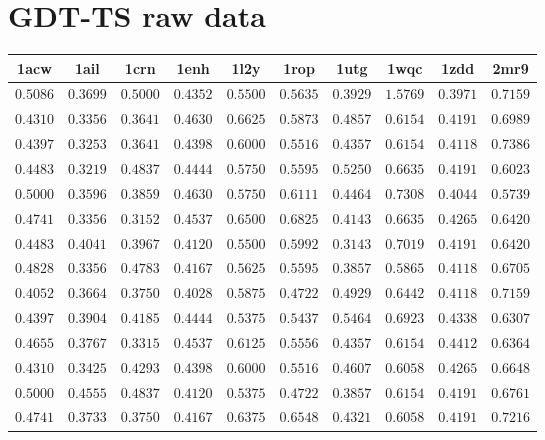 \chapter{GDT-TS raw data}\label{appendix:gdtts-data}

\centering
\begin{longtable}{c|c|c|c|c|c|c|c|c|c}
1acw & 1ail & 1crn & 1enh & 1l2y & 1rop & 1utg & 1wqc & 1zdd & 2mr9 \\ \hline \hline
$0.5086$ & $0.3699$ & $0.5000$ & $0.4352$ & $0.5500$ & $0.5635$ & $0.3929$ & $1.5769$ & $0.3971$ & $0.7159$ \\ \hline
$0.4310$ & $0.3356$ & $0.3641$ & $0.4630$ & $0.6625$ & $0.5873$ & $0.4857$ & $0.6154$ & $0.4191$ & $0.6989$ \\ \hline
$0.4397$ & $0.3253$ & $0.3641$ & $0.4398$ & $0.6000$ & $0.5516$ & $0.4357$ & $0.6154$ & $0.4118$ & $0.7386$ \\ \hline
$0.4483$ & $0.3219$ & $0.4837$ & $0.4444$ & $0.5750$ & $0.5595$ & $0.5250$ & $0.6635$ & $0.4191$ & $0.6023$ \\ \hline
$0.5000$ & $0.3596$ & $0.3859$ & $0.4630$ & $0.5750$ & $0.6111$ & $0.4464$ & $0.7308$ & $0.4044$ & $0.5739$ \\ \hline
$0.4741$ & $0.3356$ & $0.3152$ & $0.4537$ & $0.6500$ & $0.6825$ & $0.4143$ & $0.6635$ & $0.4265$ & $0.6420$ \\ \hline
$0.4483$ & $0.4041$ & $0.3967$ & $0.4120$ & $0.5500$ & $0.5992$ & $0.3143$ & $0.7019$ & $0.4191$ & $0.6420$ \\ \hline
$0.4828$ & $0.3356$ & $0.4783$ & $0.4167$ & $0.5625$ & $0.5595$ & $0.3857$ & $0.5865$ & $0.4118$ & $0.6705$ \\ \hline
$0.4052$ & $0.3664$ & $0.3750$ & $0.4028$ & $0.5875$ & $0.4722$ & $0.4929$ & $0.6442$ & $0.4118$ & $0.7159$ \\ \hline
$0.4397$ & $0.3904$ & $0.4185$ & $0.4444$ & $0.5375$ & $0.5437$ & $0.5464$ & $0.6923$ & $0.4338$ & $0.6307$ \\ \hline
$0.4655$ & $0.3767$ & $0.3315$ & $0.4537$ & $0.6125$ & $0.5556$ & $0.4357$ & $0.6154$ & $0.4412$ & $0.6364$ \\ \hline
$0.4310$ & $0.3425$ & $0.4293$ & $0.4398$ & $0.6000$ & $0.5516$ & $0.4607$ & $0.6058$ & $0.4265$ & $0.6648$ \\ \hline
$0.5000$ & $0.4555$ & $0.4837$ & $0.4120$ & $0.5375$ & $0.4722$ & $0.3857$ & $0.6154$ & $0.4191$ & $0.6761$ \\ \hline
$0.4741$ & $0.3733$ & $0.3750$ & $0.4167$ & $0.6375$ & $0.6548$ & $0.4321$ & $0.6058$ & $0.4191$ & $0.7216$ \\ \hline

\end{longtable}

